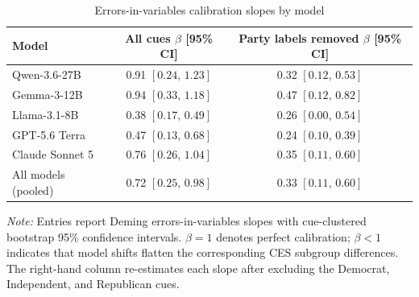 \begin{table}[H]
\centering
\caption{Errors-in-variables calibration slopes by model}
\label{tab:calibration_slopes}
\small
\setlength{\tabcolsep}{8pt}
\begin{tabular}{lcc}
\toprule
\textbf{Model}
& \shortstack{\textbf{All cues} \\ $\beta$ [95\% CI]}
& \shortstack{\textbf{Party labels removed} \\ $\beta$ [95\% CI]} \\
\midrule
Qwen-3.6-27B
& 0.91 $[0.24,\,1.23]$
& 0.32 $[0.12,\,0.53]$ \\
Gemma-3-12B
& 0.94 $[0.33,\,1.18]$
& 0.47 $[0.12,\,0.82]$ \\
Llama-3.1-8B
& 0.38 $[0.17,\,0.49]$
& 0.26 $[0.00,\,0.54]$ \\
GPT-5.6 Terra
& 0.47 $[0.13,\,0.68]$
& 0.24 $[0.10,\,0.39]$ \\
Claude Sonnet 5
& 0.76 $[0.26,\,1.04]$
& 0.35 $[0.11,\,0.60]$ \\
\midrule
All models (pooled)
& 0.72 $[0.25,\,0.98]$
& 0.33 $[0.11,\,0.60]$ \\
\bottomrule
\end{tabular}

\vspace{3pt}
\begin{minipage}{0.92\linewidth}
\footnotesize\textit{Note:} Entries report Deming errors-in-variables slopes
with cue-clustered bootstrap 95\% confidence intervals. $\beta=1$ denotes
perfect calibration; $\beta<1$ indicates that model shifts flatten the
corresponding CES subgroup differences. The right-hand column re-estimates each
slope after excluding the Democrat, Independent, and Republican cues.
\end{minipage}
\end{table}
